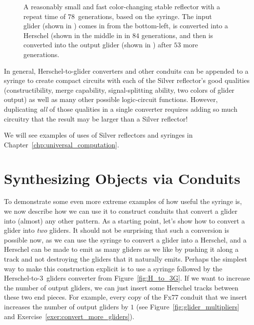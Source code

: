 \begin{figure}[!htb]
	\centering{}
	\caption{A reasonably small and fast color-changing stable reflector with a repeat time of $78$~generations, based on the syringe. The input glider (shown in ) comes in from the bottom-left, is converted into a Herschel (shown in the middle in  in $84$ generations, and then is converted into the output glider (shown in ) after $53$ more generations.}\label{fig:color_change_stable}
\end{figure}

In general, Herschel-to-glider converters and other conduits can be appended to a syringe to create compact circuits with each of the Silver reflector's good qualities (constructibility, merge capability, signal-splitting ability, two colors of glider output) as well as many other possible logic-circuit functions.  However, duplicating \emph{all} of those qualities in a single converter requires adding so much circuitry that the result may be larger than a Silver reflector!

We will see examples of uses of Silver reflectors and syringes in Chapter~\ref{chp:universal_computation}.


\section{Synthesizing Objects via Conduits}\label{sec:other_converters}

To demonstrate some even more extreme examples of how useful the syringe is, we now describe how we can use it to construct conduits that convert a glider into (almost) any other pattern. As a starting point, let's show how to convert a glider into \emph{two} gliders. It should not be surprising that such a conversion is possible now, as we can use the syringe to convert a glider into a Herschel, and a Herschel can be made to emit as many gliders as we like by pushing it along a track and not destroying the gliders that it naturally emits. Perhaps the simplest way to make this construction explicit is to use a syringe followed by the Herschel-to-$3$~gliders converter from Figure~\ref{fig:H_to_3G}. If we want to increase the number of output gliders, we can just insert some Herschel tracks between these two end pieces. For example, every copy of the Fx77 conduit that we insert increases the number of output gliders by $1$ (see Figure~\ref{fig:glider_multipliers} and Exercise~\ref{exer:convert_more_gliders}).

